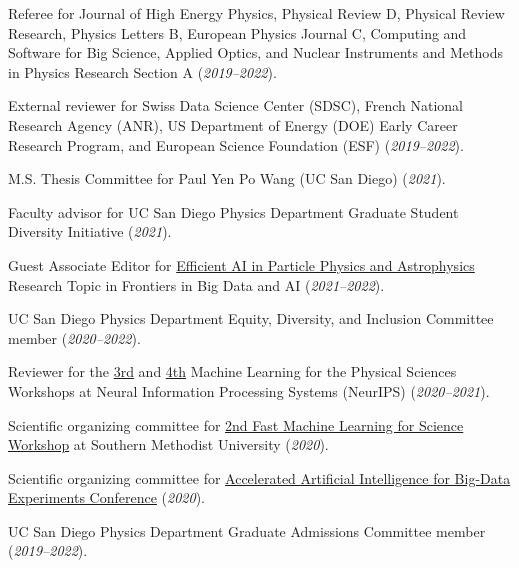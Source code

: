 \documentclass{res}
\begin{document}
\begin{resume}
  Referee for Journal of High Energy Physics, Physical Review D, Physical Review Research, Physics Letters B, European Physics Journal C, Computing and Software for Big Science, Applied Optics, and Nuclear Instruments and Methods in Physics Research Section A (\textit{2019--2022}).

  External reviewer for Swiss Data Science Center (SDSC), French National Research Agency (ANR), US Department of Energy (DOE) Early Career Research Program, and European Science Foundation (ESF) (\textit{2019--2022}).

  M.S. Thesis Committee for Paul Yen Po Wang (UC San Diego) (\textit{2021}).

  Faculty advisor for UC San Diego Physics Department Graduate Student Diversity Initiative (\textit{2021}).

  Guest Associate Editor for \href{https://www.frontiersin.org/research-topics/19095/efficient-ai-in-particle-physics-and-astrophysics}{Efficient AI in Particle Physics and Astrophysics} Research Topic in Frontiers in Big Data and AI (\textit{2021--2022}).

  UC San Diego Physics Department Equity, Diversity, and Inclusion Committee member (\textit{2020--2022}).

  Reviewer for the \href{https://ml4physicalsciences.github.io/2020/}{3rd} and \href{https://ml4physicalsciences.github.io/2021/}{4th} Machine Learning for the Physical Sciences Workshops at Neural Information Processing Systems (NeurIPS) (\textit{2020--2021}).

  Scientific organizing committee for \href{https://indico.cern.ch/e/fml2020}{2nd Fast Machine Learning for Science Workshop} at Southern Methodist University (\textit{2020}).

  Scientific organizing committee for \href{http://www.ncsa.illinois.edu/Conferences/AcceleratedAINCSA/}{Accelerated Artificial Intelligence for Big-Data Experiments Conference} (\textit{2020}).

  UC San Diego Physics Department Graduate Admissions Committee member (\textit{2019--2022}).

\end{resume}
\end{document}
